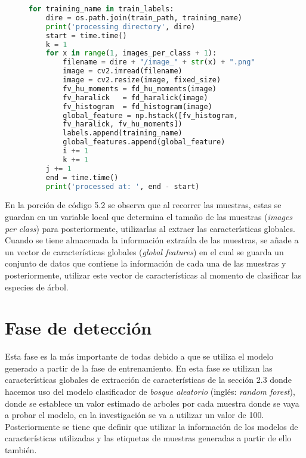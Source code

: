 \begin{figure}[H]
\centering
\begin{lstlisting}[basicstyle=\small, language=Python, caption=Código para entrenar modelo]
for training_name in train_labels:
    dire = os.path.join(train_path, training_name)
    print('processing directory', dire)
    start = time.time()
    k = 1
    for x in range(1, images_per_class + 1):
        filename = dire + "/image_" + str(x) + ".png"
        image = cv2.imread(filename)
        image = cv2.resize(image, fixed_size)
        fv_hu_moments = fd_hu_moments(image)
        fv_haralick   = fd_haralick(image)
        fv_histogram  = fd_histogram(image)
        global_feature = np.hstack([fv_histogram, 
        fv_haralick, fv_hu_moments])
        labels.append(training_name)
        global_features.append(global_feature)
        i += 1
        k += 1
    j += 1
    end = time.time()
    print('processed at: ', end - start)
\end{lstlisting}
\label{Recorriendo-folders}
\end{figure}
En la porción de código 5.2 se observa que al recorrer las muestras, estas se guardan en un variable local que determina el tamaño de las muestras (\emph{images per class}) para posteriormente, utilizarlas al extraer las características globales. Cuando se tiene almacenada la información extraída de las muestras, se añade a un vector de características globales (\emph{global features}) en el cual se guarda un conjunto de datos que contiene la información de cada una de las muestras y posteriormente, utilizar este vector de características al momento de clasificar las especies de árbol. 

\section{Fase de detección}
Esta fase es la más importante de todas debido a que se utiliza el modelo generado a partir de la fase de entrenamiento. En esta fase se utilizan las características globales de extracción de características de la sección 2.3 donde hacemos uso del modelo clasificador de {\em bosque aleatorio} (inglés: {\em random forest})\footnotemark, donde se establece un valor estimado de arboles por cada muestra donde se vaya a probar el modelo, en la investigación se va a utilizar un valor de 100. Posteriormente se tiene que definir que utilizar la información de los modelos de características utilizadas y las etiquetas de muestras generadas a partir de ello también. 
\\

